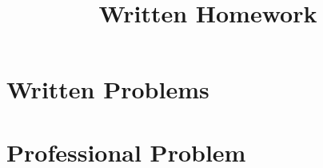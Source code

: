 \documentclass{ximera}
\title{Written Homework}
\begin{document}
\begin{abstract}
\end{abstract}
\maketitle
\section{Written Problems}



\section{Professional Problem}

\end{document}
